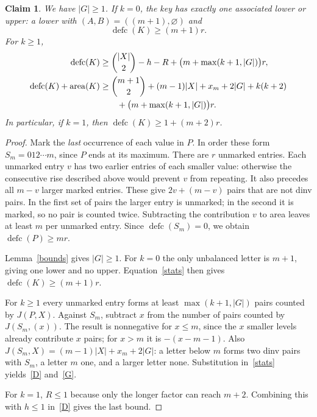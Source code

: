 \documentclass[11pt]{article}
\DeclareMathOperator{\area}{area}\DeclareMathOperator{\dinv}{dinv}
\DeclareMathOperator{\defc}{defc}\DeclareMathOperator{\sym}{sym}
\newtheorem{claim}{Claim}
\begin{document}
\begin{claim}\label{maximum-estimates}
We have $|G|\ge1$. If $k=0$, the key has exactly one associated lower or upper: a lower with $(A,B)=((m+1),\varnothing)$ and
\[
 \defc(K)\ge(m+1)r.
\]
For $k\ge1$,
\begin{align}
 \defc(K)&\ge \binom{|X|}{2}-h-R+\bigl(m+\max(k+1,|G|)\bigr)r,\label{D}\\
 \defc(K)+\area(K)&\ge \binom{m+1}2+(m-1)|X|+x_m+2|G|+k(k+2)\notag\\
             &\qquad+\bigl(m+\max(k+1,|G|)\bigr)r.\label{G}
\end{align}
In particular, if $k=1$, then $\defc(K)\ge1+(m+2)r$.
\end{claim}
\begin{proof}
Mark the \emph{last} occurrence of each value in $P$. In order these form $S_m=012\cdots m$, since $P$ ends at its maximum. There are $r$ unmarked entries. Each unmarked entry $v$ has two earlier entries of each smaller value: otherwise the consecutive rise described above would prevent $v$ from repeating. It also precedes all $m-v$ larger marked entries. These give $2v+(m-v)$ pairs that are not dinv pairs. In the first set of pairs the larger entry is unmarked; in the second it is marked, so no pair is counted twice. Subtracting the contribution $v$ to area leaves at least $m$ per unmarked entry. Since $\defc(S_m)=0$, we obtain $\defc(P)\ge mr$.

Lemma~\ref{bounds} gives $|G|\ge1$. For $k=0$ the only unbalanced letter is $m+1$, giving one lower and no upper. Equation~\eqref{stats} then gives $\defc(K)\ge(m+1)r$.

For $k\ge1$ every unmarked entry forms at least $\max(k+1,|G|)$ pairs counted by $J(P,X)$. Against $S_m$, subtract $x$ from the number of pairs counted by $J(S_m,(x))$. The result is nonnegative for $x\le m$, since the $x$ smaller levels already contribute $x$ pairs; for $x>m$ it is $-(x-m-1)$. Also $J(S_m,X)=(m-1)|X|+x_m+2|G|$: a letter below $m$ forms two dinv pairs with $S_m$, a letter $m$ one, and a larger letter none. Substitution in~\eqref{stats} yields~\eqref{D} and~\eqref{G}.

For $k=1$, $R\le1$ because only the longer factor can reach $m+2$. Combining this with $h\le1$ in~\eqref{D} gives the last bound.
\end{proof}
\end{document}
